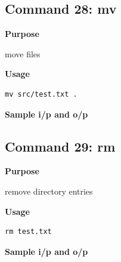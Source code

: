 \documentclass{article}
\begin{document}
\subsection{Command 28: mv} 
\textbf{Purpose}
\begin{flushleft}
 move files
\end{flushleft}
\textbf{Usage}
\begin{verbatim}
mv src/test.txt .
\end{verbatim}
\textbf{Sample i/p and o/p}
\begin{figure}[H] 
\end{figure}
\subsection{Command 29: rm} 
\textbf{Purpose}
\begin{flushleft}
 remove directory entries
\end{flushleft}
\textbf{Usage}
\begin{verbatim}
rm test.txt
\end{verbatim}
\textbf{Sample i/p and o/p}
\begin{figure}[H] 
\end{figure}
\end{document}
